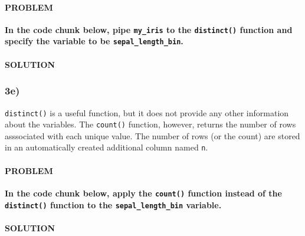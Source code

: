 \documentclass[]{article}
\newenvironment{Shaded}{\begin{snugshade}}{\end{snugshade}}
\newcommand{\CommentTok}[1]{\textcolor[rgb]{0.56,0.35,0.01}{\textit{#1}}}
\newcommand{\KeywordTok}[1]{\textcolor[rgb]{0.13,0.29,0.53}{\textbf{#1}}}
\newcommand{\NormalTok}[1]{#1}
\newcommand{\OperatorTok}[1]{\textcolor[rgb]{0.81,0.36,0.00}{\textbf{#1}}}
\newcommand{\StringTok}[1]{\textcolor[rgb]{0.31,0.60,0.02}{#1}}
\let\oldparagraph\paragraph
\renewcommand{\paragraph}[1]{\oldparagraph{#1}\mbox{}}
\begin{document}
\hypertarget{problem-14}{%
\paragraph{PROBLEM}\label{problem-14}}

\textbf{In the code chunk below, pipe \texttt{my\_iris} to the
\texttt{distinct()} function and specify the variable to be
\texttt{sepal\_length\_bin}.}

\hypertarget{solution-13}{%
\paragraph{SOLUTION}\label{solution-13}}

\begin{Shaded}
\end{Shaded}

\hypertarget{e-2}{%
\subsubsection{3e)}\label{e-2}}

\texttt{distinct()} is a useful function, but it does not provide any
other information about the variables. The \texttt{count()} function,
however, returns the number of rows asssociated with each unique value.
The number of rows (or the count) are stored in an automatically created
additional column named \texttt{n}.

\hypertarget{problem-15}{%
\paragraph{PROBLEM}\label{problem-15}}

\textbf{In the code chunk below, apply the \texttt{count()} function
instead of the \texttt{distinct()} function to the
\texttt{sepal\_length\_bin} variable.}

\hypertarget{solution-14}{%
\paragraph{SOLUTION}\label{solution-14}}

\begin{Shaded}
\end{Shaded}
\end{document}
